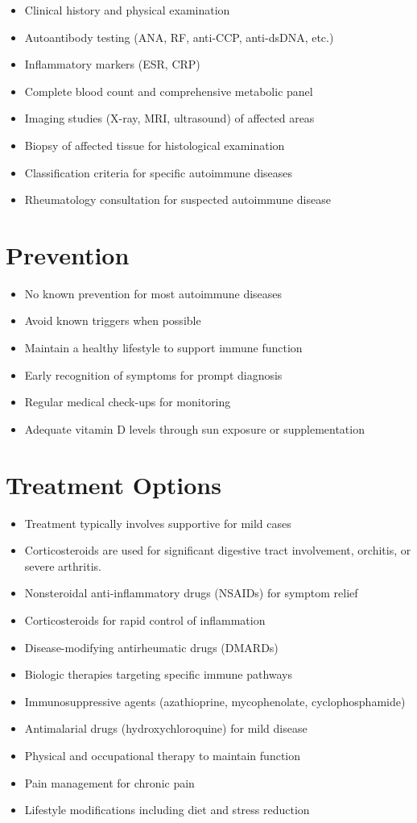 \begin{itemize}[noitemsep]
  \item Clinical history and physical examination
  \item Autoantibody testing (ANA, RF, anti-CCP, anti-dsDNA, etc.)
  \item Inflammatory markers (ESR, CRP)
  \item Complete blood count and comprehensive metabolic panel
  \item Imaging studies (X-ray, MRI, ultrasound) of affected areas
  \item Biopsy of affected tissue for histological examination
  \item Classification criteria for specific autoimmune diseases
  \item Rheumatology consultation for suspected autoimmune disease
\end{itemize}
\section{Prevention}
\begin{itemize}[noitemsep]
  \item No known prevention for most autoimmune diseases
  \item Avoid known triggers when possible
  \item Maintain a healthy lifestyle to support immune function
  \item Early recognition of symptoms for prompt diagnosis
  \item Regular medical check-ups for monitoring
  \item Adequate vitamin D levels through sun exposure or supplementation
\end{itemize}
\section{Treatment Options}
\begin{itemize}[noitemsep]
  \item Treatment typically involves supportive for mild cases
  \item Corticosteroids are used for significant digestive tract involvement, orchitis, or severe arthritis.
  \item Nonsteroidal anti-inflammatory drugs (NSAIDs) for symptom relief
  \item Corticosteroids for rapid control of inflammation
  \item Disease-modifying antirheumatic drugs (DMARDs)
  \item Biologic therapies targeting specific immune pathways
  \item Immunosuppressive agents (azathioprine, mycophenolate, cyclophosphamide)
  \item Antimalarial drugs (hydroxychloroquine) for mild disease
  \item Physical and occupational therapy to maintain function
  \item Pain management for chronic pain
  \item Lifestyle modifications including diet and stress reduction
\end{itemize}

